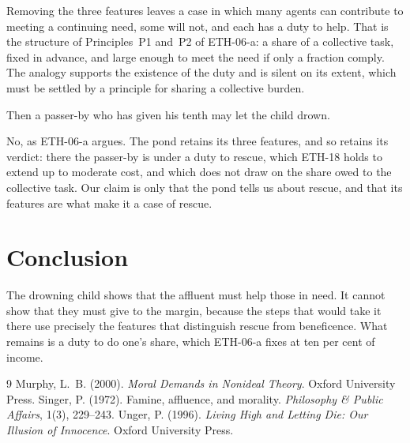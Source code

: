 \documentclass{situationist-preprint}
\begin{document}
Removing the three features leaves a case in which many agents can contribute to meeting a continuing need, some will not, and each has a duty to help. That is the structure of Principles~P1 and~P2 of ETH-06-a: a share of a collective task, fixed in advance, and large enough to meet the need if only a fraction comply. The analogy supports the existence of the duty and is silent on its extent, which must be settled by a principle for sharing a collective burden.

\begin{objection}
Then a passer-by who has given his tenth may let the child drown.
\end{objection}

\begin{reply}
No, as ETH-06-a argues. The pond retains its three features, and so retains its verdict: there the passer-by is under a duty to rescue, which ETH-18 holds to extend up to moderate cost, and which does not draw on the share owed to the collective task. Our claim is only that the pond tells us about rescue, and that its features are what make it a case of rescue.
\end{reply}

\section{Conclusion}

The drowning child shows that the affluent must help those in need. It cannot show that they must give to the margin, because the steps that would take it there use precisely the features that distinguish rescue from beneficence. What remains is a duty to do one's share, which ETH-06-a fixes at ten per cent of income.

\begin{thebibliography}{9}\small
{} Murphy, L.~B. (2000). \emph{Moral Demands in Nonideal Theory}. Oxford University Press.
 Singer, P. (1972). Famine, affluence, and morality. \emph{Philosophy \& Public Affairs}, 1(3), 229--243.
 Unger, P. (1996). \emph{Living High and Letting Die: Our Illusion of Innocence}. Oxford University Press.
\end{thebibliography}
\end{document}
